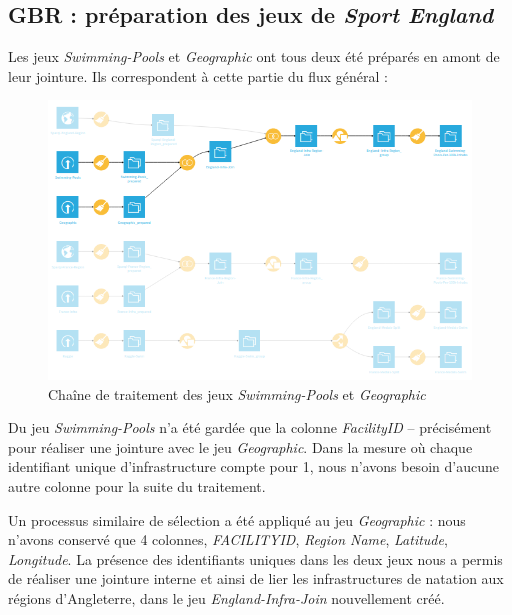 \documentclass[hidelinks, 12pt]{report}
\begin{document}
%





\subsection{GBR : préparation des jeux de \textit{Sport England}}

Les jeux \textit{Swimming-Pools} et \textit{Geographic} ont tous deux été préparés en amont de leur jointure. Ils correspondent à cette partie du flux général :

\begin{center}
	\begin{figure}[H]
		\centering
		\setlength{\belowcaptionskip}{-35pt}
		\includegraphics[scale=0.5]{images/flow-swim-eng-sport.png}
		\caption{Chaîne de traitement des jeux \textit{Swimming-Pools} et \textit{Geographic}}
	\end{figure}
\end{center}

Du jeu \textit{Swimming-Pools} n'a été gardée que la colonne \textit{FacilityID} -- précisément pour réaliser une jointure avec le jeu \textit{Geographic}. Dans la mesure où chaque identifiant unique d'infrastructure compte pour 1, nous n'avons besoin d'aucune autre colonne pour la suite du traitement.

Un processus similaire de sélection a été appliqué au jeu \textit{Geographic} : nous n'avons conservé que 4 colonnes, \textit{FACILITYID}, \textit{Region Name}, \textit{Latitude}, \textit{Longitude}. La présence des identifiants uniques dans les deux jeux nous a permis de réaliser une jointure interne et ainsi de lier les infrastructures de natation aux régions d'Angleterre, dans le jeu \textit{England-Infra-Join} nouvellement créé.
\end{document}
